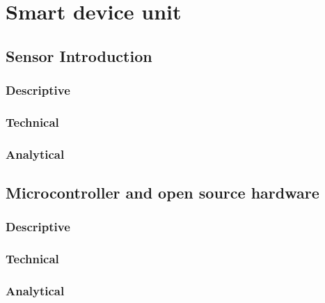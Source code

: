 \chapter{Smart device unit}
\thispagestyle{fancy}



\section{Sensor Introduction}
\subsection{Descriptive}
\subsection{Technical}
\subsection{Analytical}

\section{Microcontroller and open source hardware}
\subsection{Descriptive}
\subsection{Technical}
\subsection{Analytical}